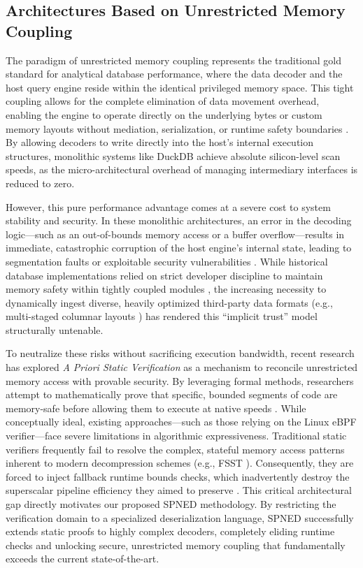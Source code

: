 \documentclass[onecolumn]{IEEEtran}
\numberwithin{equation}{section}
\theoremstyle{definition}
\theoremstyle{remark}
\begin{document}
\subsection{Architectures Based on Unrestricted Memory Coupling}

The paradigm of unrestricted memory coupling represents the traditional gold standard for analytical database performance, where the data decoder and the host query engine reside within the identical privileged memory space. This tight coupling allows for the complete elimination of data movement overhead, enabling the engine to operate directly on the underlying bytes or custom memory layouts without mediation, serialization, or runtime safety boundaries \cite{haas2012builtin, apache2018parquet}. By allowing decoders to write directly into the host's internal execution structures, monolithic systems like DuckDB \cite{duckdb2025duckdb} achieve absolute silicon-level scan speeds, as the micro-architectural overhead of managing intermediary interfaces is reduced to zero.

However, this pure performance advantage comes at a severe cost to system stability and security. In these monolithic architectures, an error in the decoding logic---such as an out-of-bounds memory access or a buffer overflow---results in immediate, catastrophic corruption of the host engine's internal state, leading to segmentation faults or exploitable security vulnerabilities \cite{paul2021cve, redhat2017cve}. While historical database implementations relied on strict developer discipline to maintain memory safety within tightly coupled modules \cite{haas2012builtin}, the increasing necessity to dynamically ingest diverse, heavily optimized third-party data formats (e.g., multi-staged columnar layouts \cite{kuschewski2023btrblocks}) has rendered this ``implicit trust'' model structurally untenable.

To neutralize these risks without sacrificing execution bandwidth, recent research has explored \textit{A Priori Static Verification} as a mechanism to reconcile unrestricted memory access with provable security. By leveraging formal methods, researchers attempt to mathematically prove that specific, bounded segments of code are memory-safe before allowing them to execute at native speeds \cite{vishwanathan2023verifying}. While conceptually ideal, existing approaches---such as those relying on the Linux eBPF verifier---face severe limitations in algorithmic expressiveness. Traditional static verifiers frequently fail to resolve the complex, stateful memory access patterns inherent to modern decompression schemes (e.g., FSST \cite{boncz2020fsst}). Consequently, they are forced to inject fallback runtime bounds checks, which inadvertently destroy the superscalar pipeline efficiency they aimed to preserve \cite{sun2024finding}. This critical architectural gap directly motivates our proposed SPNED methodology. By restricting the verification domain to a specialized deserialization language, SPNED successfully extends static proofs to highly complex decoders, completely eliding runtime checks and unlocking secure, unrestricted memory coupling that fundamentally exceeds the current state-of-the-art.
\end{document}
